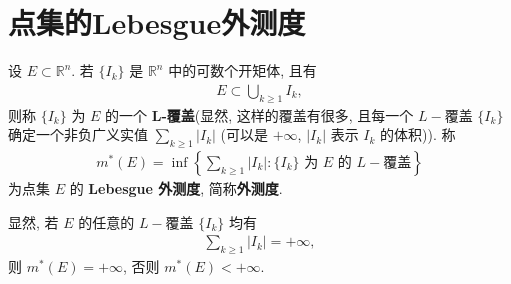 \documentclass[../../main.tex]{subfiles}
\begin{document}
\section{点集的Lebesgue外测度}

\begin{definition}[Lebesgue外测度]
设 \(E \subset \mathbb{R}^n\). 若 \(\{I_k\}\) 是 \(\mathbb{R}^n\) 中的可数个开矩体, 且有
\begin{align*}
E \subset \bigcup_{k \geqslant  1} I_k,
\end{align*}
则称 \(\{I_k\}\) 为 \(E\) 的一个 \textbf{L-覆盖}(显然, 这样的覆盖有很多, 且每一个 \(L -\)覆盖 \(\{I_k\}\) 确定一个非负广义实值 \(\sum_{k \geqslant  1} |I_k|\) (可以是 \(+ \infty\), \(|I_k|\) 表示 \(I_k\) 的体积)). 称
\begin{align*}
m^*(E) = \inf \left\{ \sum_{k \geqslant  1} |I_k| : \{I_k\} \text{ 为 } E \text{ 的 } L-\text{覆盖} \right\}
\end{align*}
为点集 \(E\) 的 \textbf{Lebesgue 外测度}, 简称\textbf{外测度}.
\end{definition}
\begin{remark}
显然, 若 \(E\) 的任意的 \(L -\)覆盖 \(\{I_k\}\) 均有
\begin{align*}
\sum_{k \geqslant  1} |I_k| = + \infty,
\end{align*}
则 \(m^*(E) = + \infty\), 否则 \(m^*(E) < + \infty\). 
\end{remark}
\end{document}
